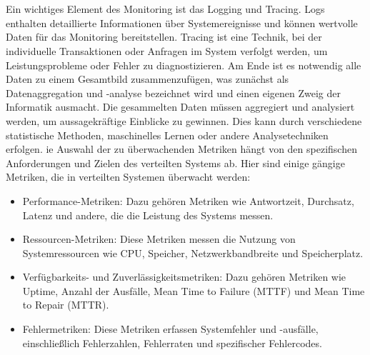 \\\\
Ein wichtiges Element des Monitoring ist das Logging und Tracing. Logs enthalten detaillierte Informationen über Systemereignisse und können wertvolle Daten für das Monitoring bereitstellen. Tracing ist eine Technik, bei der individuelle Transaktionen oder Anfragen im System verfolgt werden, um Leistungsprobleme oder Fehler zu diagnostizieren.
Am Ende ist es notwendig alle Daten zu einem Gesamtbild zusammenzufügen, was zunächst als Datenaggregation und -analyse bezeichnet wird und einen eigenen Zweig der Informatik ausmacht. Die gesammelten Daten müssen aggregiert und analysiert werden, um aussagekräftige Einblicke zu gewinnen. Dies kann durch verschiedene statistische Methoden, maschinelles Lernen oder andere Analysetechniken erfolgen.
ie Auswahl der zu überwachenden Metriken hängt von den spezifischen Anforderungen und Zielen des verteilten Systems ab. Hier sind einige gängige Metriken, die in verteilten Systemen überwacht werden:
\begin{itemize}
\item Performance-Metriken: Dazu gehören Metriken wie Antwortzeit, Durchsatz, Latenz und andere, die die Leistung des Systems messen.
\item Ressourcen-Metriken: Diese Metriken messen die Nutzung von Systemressourcen wie CPU, Speicher, Netzwerkbandbreite und Speicherplatz.
\item Verfügbarkeits- und Zuverlässigkeitsmetriken: Dazu gehören Metriken wie Uptime, Anzahl der Ausfälle, Mean Time to Failure (MTTF) und Mean Time to Repair (MTTR).
\item Fehlermetriken: Diese Metriken erfassen Systemfehler und -ausfälle, einschließlich Fehlerzahlen, Fehlerraten und spezifischer Fehlercodes.
\end{itemize}

